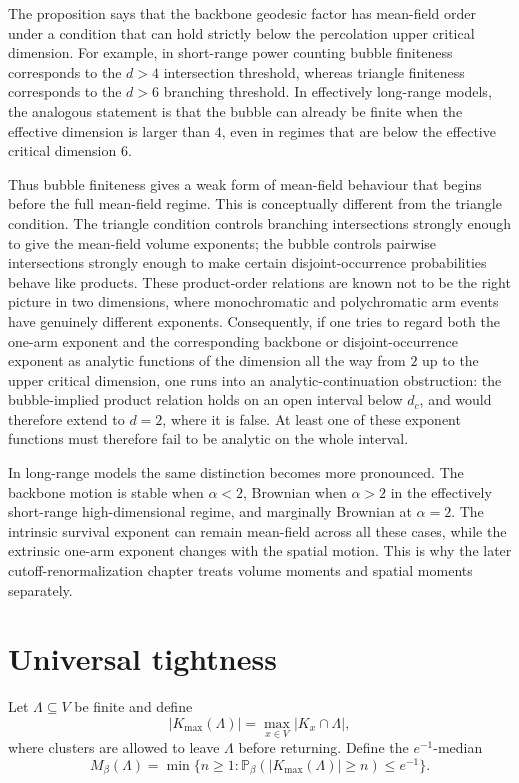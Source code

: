 \documentclass[11pt,reqno]{book}
\numberwithin{equation}{chapter}
\theoremstyle{plain}
\theoremstyle{definition}
\theoremstyle{remark}
\renewcommand{\P}{\mathbb P}
\newcommand{\1}{\mathbf 1}
\begin{document}
The proposition says that the backbone geodesic factor has mean-field order
under a condition that can hold strictly below the percolation upper critical
dimension. For example, in short-range power counting bubble finiteness
corresponds to the \(d>4\) intersection threshold, whereas triangle
finiteness corresponds to the \(d>6\) branching threshold. In effectively
long-range models, the analogous statement is that the bubble can already be
finite when the effective dimension is larger than \(4\), even in regimes
that are below the effective critical dimension \(6\).

Thus bubble finiteness gives a weak form of mean-field behaviour that begins before the full mean-field regime. This is conceptually different from the triangle condition. The triangle condition controls branching intersections strongly enough to give the mean-field volume exponents; the bubble controls pairwise intersections strongly enough to make certain disjoint-occurrence probabilities behave like products. These product-order relations are known not to be the right picture in two dimensions, where monochromatic and polychromatic arm events have genuinely different exponents. Consequently, if one tries to regard both the one-arm exponent and the corresponding backbone or disjoint-occurrence exponent as analytic functions of the dimension all the way from \(2\) up to the upper critical dimension, one runs into an analytic-continuation obstruction: the bubble-implied product relation holds on an open interval below \(d_c\), and would therefore extend to \(d=2\), where it is false. At least one of these exponent functions must therefore fail to be analytic on the whole interval.

In long-range models the same distinction becomes more pronounced. The backbone motion is stable when \(\alpha<2\), Brownian when \(\alpha>2\) in the effectively short-range high-dimensional regime, and marginally Brownian at \(\alpha=2\). The intrinsic survival exponent can remain mean-field across all these cases, while the extrinsic one-arm exponent changes with the spatial motion. This is why the later cutoff-renormalization chapter treats volume moments and spatial moments separately.

\section{Universal tightness}

Let $\Lambda\subseteq V$ be finite and define
\[
  |K_{\max}(\Lambda)|
  =
  \max_{x\in V}|K_x\cap\Lambda|,
\]
where clusters are allowed to leave $\Lambda$ before returning. Define the $e^{-1}$-median
\[
  M_\beta(\Lambda)
  =
  \min\{n\geq1:\P_\beta(|K_{\max}(\Lambda)|\geq n)\leq e^{-1}\}.
\]
\end{document}
